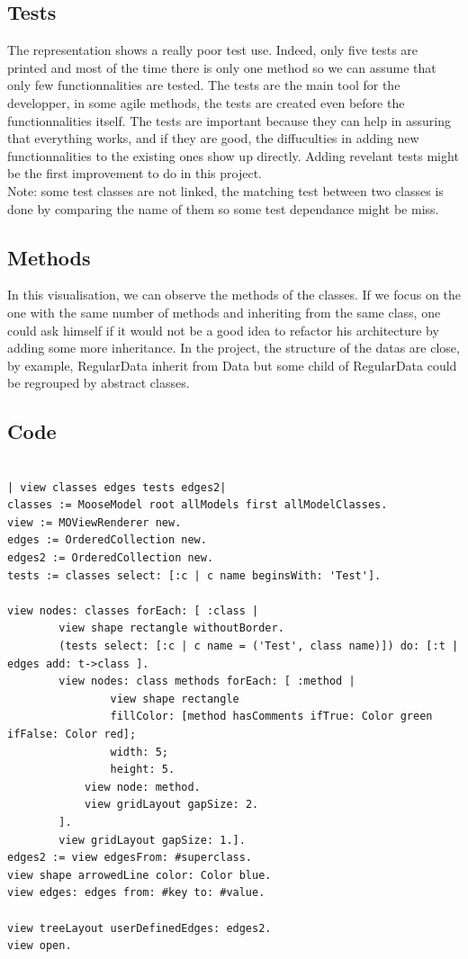 \documentclass[a4paper,10pt]{article}
\begin{document}
\subsection{Tests}
The representation shows a really poor test use. Indeed, only five tests are printed and most of the time there is only one method so we can assume that only few functionnalities are tested. The tests are the main tool for the developper, in some agile methods, the tests are created even before the functionnalities itself. The tests are important because they can help in assuring that everything works, and if they are good, the diffuculties in adding new functionnalities to the existing ones show up directly. Adding revelant tests might be the first improvement to do in this project.\\
Note: some test classes are not linked, the matching test between two classes is done by comparing the name of them so some test dependance might be miss.

\subsection{Methods}
In this visualisation, we can observe the methods of the classes. If we focus on the one with the same number of methods and inheriting from the same class, one could ask himself if it would not be a good idea to refactor his architecture by adding some more inheritance. In the project, the structure of the datas are close, by example, RegularData inherit from Data but some child of RegularData could be regrouped by abstract classes.

\newpage
\subsection{Code}
\begin{verbatim}

| view classes edges tests edges2|
classes := MooseModel root allModels first allModelClasses.
view := MOViewRenderer new.
edges := OrderedCollection new.
edges2 := OrderedCollection new.
tests := classes select: [:c | c name beginsWith: 'Test'].

view nodes: classes forEach: [ :class |
        view shape rectangle withoutBorder.
        (tests select: [:c | c name = ('Test', class name)]) do: [:t | edges add: t->class ].
        view nodes: class methods forEach: [ :method | 
                view shape rectangle 
                fillColor: [method hasComments ifTrue: Color green ifFalse: Color red];
                width: 5;
                height: 5.
            view node: method. 
            view gridLayout gapSize: 2.
        ].
        view gridLayout gapSize: 1.].
edges2 := view edgesFrom: #superclass.
view shape arrowedLine color: Color blue.
view edges: edges from: #key to: #value.

view treeLayout userDefinedEdges: edges2.
view open.
\end{verbatim}
\end{document}
